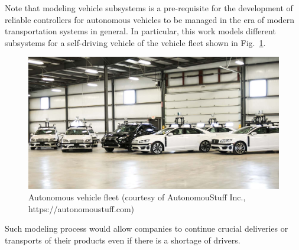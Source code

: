 \documentclass[conference]{IEEEtran}
\begin{document}
Note that modeling vehicle subsystems is a pre-requisite for the development of reliable controllers for autonomous vehicles to be managed in the era of modern transportation systems in general. In particular, this work models different subsystems for a self-driving vehicle of the vehicle fleet shown in Fig.~\ref{fig:fleet}. %
%
\begin{figure}[htbp]
  \centering
  \includegraphics[scale=0.15]{figs/img/autonomousVehiclesAStuff}
  \caption{Autonomous vehicle fleet (courtesy of AutonomouStuff Inc., https://autonomoustuff.com)}
  \label{fig:fleet}
\end{figure}
%
Such modeling process would allow companies to continue crucial deliveries or transports of their products even if there is a shortage of drivers. %
%
%
\end{document}
